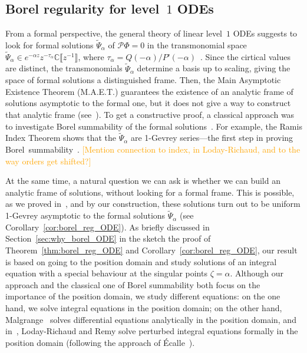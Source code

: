 \documentclass{article}
\newcommand{\C}{\mathbb{C}}
\theoremstyle{definition}
\theoremstyle{plain}
\begin{document}
\subsection{Borel regularity for level~$1$ ODEs}
%
From a formal perspective, the general theory of linear level~$1$ ODEs suggests to look for formal solutions $\tilde{\Psi}_\alpha$ of $\mathcal{P}\Phi=0$ in the transmonomial space $\tilde{\Psi}_\alpha\in e^{-\alpha z} z^{-\tau_\alpha}\C\llbracket z^{-1}\rrbracket$, where $\tau_\alpha=Q(-\alpha)/P’(-\alpha)$~\cite{int-irreg}\cite[Proposition~2.2.7, p.~111]{EcalleIII}. Since the cirtical values are distinct, the transmonomials $\tilde{\Psi}_\alpha$ determine a basis up to scaling, giving the space of formal solutions a distinguished frame. Then, the Main Asymptotic Existence Theorem (M.A.E.T.) guarantees the existence of an analytic frame of solutions asymptotic to the formal one, but it  does not give a way to construct that analytic frame (see~\cite[Chapter 14]{balser}). To get a constructive proof, a classical approach was to investigate Borel summability of the formal solutions~\cite{loday-Remy2011,diverg-resurg--ii,malgrange--fourier,malgrange1995sommation,malgrange92,ramis1991series}. For example, the Ramis Index Theorem shows that the $\tilde{\Psi}_\alpha$ are 1-Gevrey series---the first step in proving Borel~summability~\cite{ramis_index}. \textcolor{orange}{[Mention connection to index, in Loday-Richaud, and to the way orders get shifted?]}

At the same time, a natural question we can ask is whether we can build an analytic frame of solutions, without looking for a formal frame. This is possible, as we proved in~\cite{reg-sing-volterra}, and by our construction, these solutions turn out to be uniform 1-Gevrey asymptotic to the formal solutions $\tilde{\Psi}_\alpha$ (see Corollary~\ref{cor:borel_reg_ODE}). As briefly discussed in Section~\ref{sec:why_borel_ODE} in the sketch the proof of Theorem~\ref{thm:borel_reg_ODE} and Corollary~\ref{cor:borel_reg_ODE}, our result is based on going to the position domain and study solutions of an integral equation with a special behaviour at the singular points $\zeta=\alpha$. Although our approach and the classical one of Borel summability both focus on the importance of the position domain, we study different equations: on the one hand, we solve integral equations in the position domain; on the other hand, Malgrange~\cite{malgrange--fourier} solves differential equations analytically in the position domain, and in~\cite{loday-Remy2011}, Loday-Richaud and Remy solve perturbed integral equations formally in the position domain (following the approach of \'Ecalle~\cite{EcalleIII}). 
\end{document}
